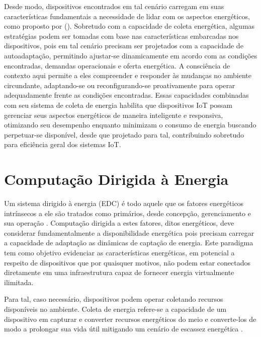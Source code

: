 Desde modo, dispositivos encontrados em tal cenário carregam em suas características fundamentais a necessidade de lidar com os aspectos energéticos, como proposto por \citeauthor{kansal_power_2007} (\citeyear{kansal_power_2007}). Sobretudo com a capacidade de coleta energética, algumas estratégias podem ser tomadas com base nas características embarcadas nos dispositivos, pois em tal cenário precisam ser projetados com a capacidade de autoadaptação, permitindo ajustar-se dinamicamente em acordo com as condições encontradas, demandas operacionais e oferta energética. A consciência de contexto aqui permite a eles compreender e responder às mudanças no ambiente circundante, adaptando-se ou reconfigurando-se proativamente para operar adequadamente frente as condições encontradas. Essas capacidades combinadas com seu sistema de coleta de energia habilita que dispositivos IoT possam gerenciar seus aspectos energéticos de maneira inteligente e responsiva, otimizando seu desempenho enquanto minimizam o consumo de energia buscando perpetuar-se disponível, desde que projetado para tal, contribuindo sobretudo para eficiência geral dos sistemas \acs{IoT}.





\section{Computação Dirigida à Energia}
\label{cap2:energyDriven}

Um sistema dirigido à energia (\ac{EDC}) é todo aquele que os fatores energéticos intrínsecos a ele são tratados como primários, desde concepção, gerenciamento e sua operação \cite{merrett_energy-driven_2017}. Computação dirigida a estes fatores, ditos energéticos, deve considerar fundamentalmente a disponibilidade energética pois precisam carregar a capacidade de adaptação as dinâmicas de captação de energia. Este paradigma tem como objetivo evidenciar as características energéticas, em potencial a respeito de dispositivos que por quaisquer motivos, não podem estar conectados diretamente em uma infraestrutura capaz de fornecer energia virtualmente ilimitada. 

Para tal, caso necessário, dispositivos podem operar coletando recursos disponíveis no ambiente. Coleta de energia refere-se a capacidade de um dispositivo em capturar e converter recursos energéticos do meio e converte-los de modo a prolongar sua vida útil mitigando um cenário de escassez energética \cite{sudevalayam_energy_2011}. 

